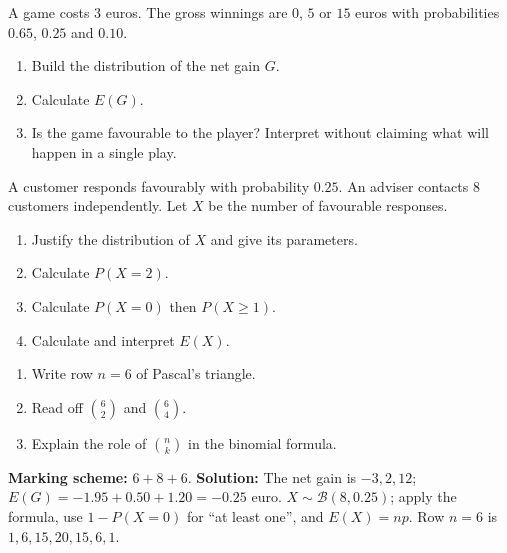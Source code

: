 \begin{exercise}
A game costs $3$ euros. The gross winnings are $0$, $5$ or $15$ euros with probabilities $\num{0,65}$, $\num{0,25}$ and $\num{0,10}$.
\begin{enumerate}
\item Build the distribution of the net gain $G$.
\item Calculate $E(G)$.
\item Is the game favourable to the player? Interpret without claiming what will happen in a single play.
\end{enumerate}
\end{exercise}
\begin{exercise}
A customer responds favourably with probability $\num{0,25}$. An adviser contacts $8$ customers independently. Let $X$ be the number of favourable responses.
\begin{enumerate}
\item Justify the distribution of $X$ and give its parameters.
\item Calculate $P(X=2)$.
\item Calculate $P(X=0)$ then $P(X\geq1)$.
\item Calculate and interpret $E(X)$.
\end{enumerate}
\end{exercise}
\begin{exercise}
\begin{enumerate}
\item Write row $n=6$ of Pascal's triangle.
\item Read off $\binom62$ and $\binom64$.
\item Explain the role of $\binom nk$ in the binomial formula.
\end{enumerate}
\end{exercise}
\begin{solution}\textbf{Marking scheme:} $6+8+6$. \textbf{Solution:} The net gain is $-3,2,12$; $E(G)=-\num{1,95}+\num{0,50}+\num{1,20}=-\num{0,25}$ euro. $X\sim\mathcal B(8,\num{0,25})$; apply the formula, use $1-P(X=0)$ for ``at least one'', and $E(X)=np$. Row $n=6$ is $1,6,15,20,15,6,1$.\end{solution}
